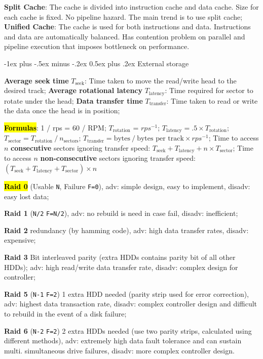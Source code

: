 \documentclass[a4paper]{article}
\makeatletter
\renewcommand{\section}{\@startsection{section}{1}{0mm}%
                                {-1ex plus -.5ex minus -.2ex}%
                                {0.5ex plus .2ex}%
                                {\normalfont\normalsize\bfseries}}
\makeatother
\begin{document}
\begin{multicols*}{2}
  \textbf{Split Cache}: The cache is divided into instruction cache and data cache. Size for each cache is fixed. No pipeline hazard. The main trend is to use split cache;
  \textbf{Unified Cache}: The cache is used for both instructions and data. Instructions and data are automatically balanced. Has contention problem on parallel and pipeline execution that imposes bottleneck on performance.

  \section{External storage}

  \textbf{Average seek time} $T_\text{seek}$: Time taken to move the read/write head to the desired track; \textbf{Average rotational latency }$T_\text{latency}$: Time required for sector to rotate under the head; \textbf{Data transfer time} $T_\text{transfer}$: Time taken to read or write the data once the head is in position;

  \hl{\textbf{Formulas}}: 1 / rps = 60 / RPM; $T_\text{rotation}$ = $rps^{-1}$; $T_\text{latency} = .5 \times T_\text{rotation}$; $T_\text{sector} = T_\text{rotation}\ /\ n_\text{sectors}$; $T_\text{transfer} = \text{bytes}\ /\ \text{bytes per track} \times rps^{-1}$; Time to access $n$ \textbf{consecutive} sectors ignoring transfer speed: $T_\text{seek} + T_\text{latency} + n \times T_\text{sector}$; Time to access $n$ \textbf{non-consecutive} sectors ignoring transfer speed: $(T_\text{seek} + T_\text{latency} + T_\text{sector}) \times n$

  \hl{\textbf{Raid 0}} (Usable \texttt{N}, Failure \texttt{F=0}), adv: simple design, easy to implement, disadv: easy lost data;

  \textbf{Raid 1} (\texttt{N/2} \texttt{F=N/2}), adv: no rebuild is need in case fail, disadv: inefficient;

  \textbf{Raid 2} redundancy (by hamming code), adv: high data transfer rates, disadv: expensive;

  \textbf{Raid 3} Bit interleaved parity (extra HDDs contains parity bit of all other HDDs); adv: high read/write data transfer rate, disadv: complex design for controller;

  \textbf{Raid 5} (\texttt{N-1} \texttt{F=2}) 1 extra HDD needed (parity strip used for error correction), adv: highest data transaction rate, disadv: complex controller design and difficult to rebuild in the event of a disk failure;

  \textbf{Raid 6} (\texttt{N-2} \texttt{F=2}) 2 extra HDDs needed (use two parity strips, calculated using different methods), adv: extremely high data fault tolerance and can sustain multi. simultaneous drive failures, disadv: more complex controller design.


\end{multicols*}
\end{document}
